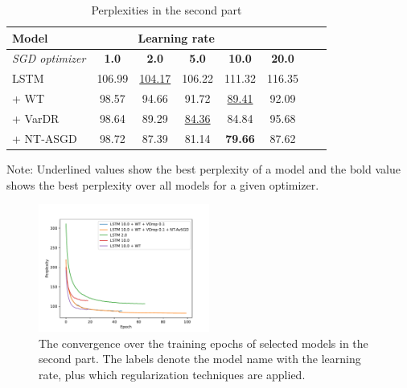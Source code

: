 \documentclass[a4paper]{article}
\begin{document}
\begin{table}
  \caption{Perplexities in the second part}
  \label{tab:dataPart2}
  \begin{tabular}{l|c c c c c c c}
    \toprule
    \textbf{Model} & \multicolumn{4}{c}{\textbf{Learning rate} } \\
    \midrule
    \textit{SGD optimizer} & \textbf{1.0} & \textbf{2.0} & \textbf{5.0} & \textbf{10.0} & \textbf{20.0} \\
    \midrule
    LSTM      & 106.99  & \underline{104.17}  & 106.22              & 111.32            & 116.35 \\ 
    + WT      & 98.57   & 94.66               & 91.72               & \underline{89.41} & 92.09 \\ 
    + VarDR   & 98.64   & 89.29               & \underline{84.36}   & 84.84             & 95.68 \\ 
    + NT-ASGD & 98.72   & 87.39               & 81.14               & \textbf{79.66}    & 87.62 \\ 
    \bottomrule
  \end{tabular}
  \begin{minipage}{8.5cm}
    \vspace{0.1cm}
    Note: Underlined values show the best perplexity of a model and the bold value shows the best perplexity over all models for a given optimizer. 
  \end{minipage}
\end{table}

\begin{figure}[htbp]
  \centering
  \includegraphics[width=0.5\textwidth]{part2_convergence.pdf}
  \caption{The convergence over the training epochs of selected models in the second part. The labels denote the model name with the learning rate, plus which regularization techniques are applied.}
  \label{fig:part_2_convergence}  
\end{figure}




\end{document}
